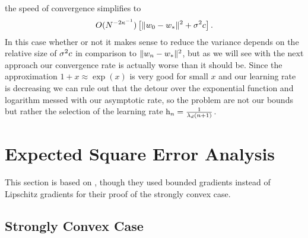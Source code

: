 the speed of convergence simplifies to
\begin{align*}
	O(N^{-2\kappa^{-1}})\left[\|w_0-w_*\|^2 + \sigma^2 c\right].
\end{align*}
In this case whether or not it makes sense to reduce the variance depends on the
relative size of \(\sigma^2 c\) in comparison to \(\|w_n-w_*\|^2\),
but as we will see with the next approach our convergence rate is actually
worse than it should be. Since the approximation \(1+x\approx\exp(x)\) is
very good for small \(x\) and our learning rate is decreasing we can
rule out that the detour over the exponential function and logarithm messed
with our asymptotic rate, so the problem are not our bounds but rather the
selection of the learning rate \(\text{h}_n = \tfrac{1}{\lambda_d(n+1)}\).


\section{Expected Square Error Analysis}

This section is based on \textcite{nemirovskiRobustStochasticApproximation2009},
though they used bounded gradients instead of Lipschitz gradients for their
proof of the strongly convex case.

\subsection{Strongly Convex Case}

